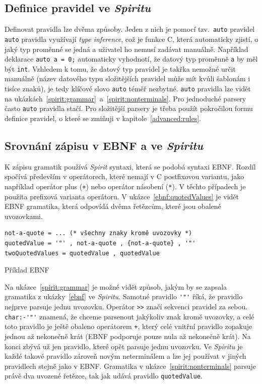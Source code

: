 \documentclass[thesis=B,czech,hidelinks]{FITthesis}[2019/03/06]
\newcommand{\Rplus}{\protect\hspace{-.1em}\protect\raisebox{.35ex}{\smaller{\smaller\textbf{+}}}}
\newcommand{\Cpp}{\mbox{C\Rplus\Rplus}\xspace}
\begin{document}
\subsection{Definice pravidel ve \textit{Spiritu}}
Definovat pravidla lze dvěma způsoby. Jeden z nich je pomocí tzv.\ \texttt{auto} pravidel \texttt{auto} pravidla využívají \textit{type inference}, což je funkce \Cpp{}, která automaticky zjistí, o jaký typ proměnné se jedná a uživatel ho nemusí zadávat manuálně. Například deklarace \verb¨auto a = 0;¨ automaticky vyhodnotí, že datový typ proměnně \texttt{a} by měl být \texttt{int}. Vzhledem k tomu, že datový typ pravidel je takřka nemožné určit manuálně (název datového typu složitějších pravidel může mít kvůli šablonám i tisíce znaků), je tedy klíčové slovo \texttt{auto} téměř nezbytné. \texttt{auto} pravidla lze vidět na ukázkách~\ref{spirit:grammar}~a~\ref{spirit:nonterminals}. Pro jednoduché parsery často \texttt{auto} pravidla stačí. Pro složitější parsery je třeba použít pokročilou formu definice pravidel, o které se zmiňuji v kapitole~\ref{advanced:rules}.

\subsection{Srovnání zápisu v EBNF a ve \textit{Spiritu}}
K zápisu gramatik používá \textit{Spirit} syntaxi, která se podobá syntaxi EBNF\@. Rozdíl spočívá především v operátorech, které nemají v \Cpp{} postfixovou variantu, jako například operátor plus (\texttt{+}) nebo operátor násobení (\texttt{*}). V těchto případech je použita prefixová varianta operátoru. V ukázce~\ref{ebnf:quotedValues} je vidět EBNF gramatika, která odpovídá dvěma řetězcům, které jsou obalené uvozovkami.

\begin{listing}
\begin{verbatim}
not-a-quote = ... (* všechny znaky kromě uvozovky *)
quotedValue = '"' , not-a-quote , {not-a-quote} , '"'
twoQuotedValues = quotedValue , quotedValue
\end{verbatim}
\caption{Příklad EBNF}\label{ebnf:quotedValues}
\end{listing}

Na ukázce~\ref{spirit:grammar} je možné vidět způsob, jakým by se zapsala gramatika z ukázky~\ref{ebnf} ve \textit{Spiritu}. Samotné pravidlo \verb¨'"'¨ říká, že pravidlo nejprve parsuje jednu uvozovku. Operátor \verb¨>>¨ značí sekvenci pravidel za sebou. \verb¨char:-'"'¨ znamená, že chceme parsenout jakýkoliv znak kromě uvozovky, a celé toto pravidlo je ještě obaleno operátorem \verb¨+¨, který celé vnitřní pravidlo zopakuje jednou až nekonečně krát (EBNF podporuje pouze nula až nekonečně krát). Na konci zbývá už jen pravidlo, které opět parsuje jednu uvozovku. Ve \textit{Spiritu} je každé takové pravidlo zároveň novým neterminálem a lze jej používat v jiných pravidlech stejně jako v EBNF\@. Gramatika v ukázce~\ref{spirit:nonterminals} parsuje právě dva uvozené řetězce, tak jak udává pravidlo \texttt{quotedValue}.
\end{document}
